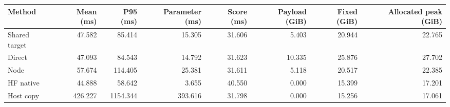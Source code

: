 \begin{tabular}{lrrrrrrr}
\toprule
Method & Mean (ms) & P95 (ms) & Parameter (ms) & Score (ms) & Payload (GiB) & Fixed (GiB) & Allocated peak (GiB)\\
\midrule
Shared target & 47.582 & 85.414 & 15.305 & 31.606 & 5.403 & 20.944 & 22.765\\
Direct & 47.093 & 84.543 & 14.792 & 31.623 & 10.335 & 25.876 & 27.702\\
Node & 57.674 & 114.405 & 25.381 & 31.611 & 5.118 & 20.517 & 22.385\\
HF native & 44.888 & 58.642 & 3.655 & 40.550 & 0.000 & 15.399 & 17.201\\
Host copy & 426.227 & 1154.344 & 393.616 & 31.798 & 0.000 & 15.256 & 17.061\\
\bottomrule
\end{tabular}
